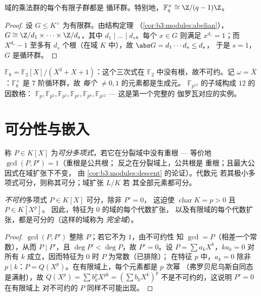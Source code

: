 \begin{theorem}[循环性]\label{thm:b3:galois:cyclic}
域的乘法群的每个有限子群都是
循环群。特别地，$\mathbb F_q^\times \cong
\Z/(q-1)\Z$。
\end{theorem}

\begin{proof}
设 $G \leq K^\times$ 为有限群。由结构定理
（\cref{cor:b3:modules:abelian}），$G \cong \Z/d_1 \times \dots
\times \Z/d_s$，其中 $d_1 \mid \dots \mid d_s$。每个 $x \in G$
则满足 $x^{d_s} = 1$；而 $X^{d_s} - 1$ 至多有
$d_s$ 个根（在域 $K$ 中），故 $\abs G = d_1\cdots d_s \leq d_s$，
于是 $s = 1$，$G$ 是循环群。
\end{proof}

\begin{example}\label{ex:b3:galois:f8}
$\mathbb F_8 = \mathbb F_2[X]/(X^3 + X + 1)$：这个三次式在
$\mathbb F_2$ 中没有根，故不可约。记 $\omega =
\bar X$：$\mathbb F_8^\times$ 是 $7$ 阶循环群，故
\emph{每个} $\neq 0, 1$ 的元素都是生成元。
$\mathbb F_{p^{12}}$ 的子域构成 $12$ 的因数格：
$\mathbb F_p, \mathbb F_{p^2}, \mathbb F_{p^3}, \mathbb F_{p^4},
\mathbb F_{p^6}, \mathbb F_{p^{12}}$ --- 这是第一个完整的
伽罗瓦对应的实例。
\end{example}

\section{可分性与嵌入}

\begin{definition}\label{def:b3:galois:separable}
称 $P \in K[X]$ 为\emph{可分多项式}，若它在分裂域中没有重根 ---
等价地 $\gcd(P, P') = 1$（重根是公共根；
反之在分裂域上，公共根是
重根；且最大公因式在域扩张下不变，
由 \cref{cor:b3:modules:descent} 的论证）。代数元
若其极小多项式可分，则称其可分；域扩张 $L/K$ 若
其全部元素都可分。
\end{definition}

\begin{proposition}\label{prop:b3:galois:perfect}
\emph{不可约}多项式 $P \in K[X]$ 可分，除非 $P' = 0$，
这迫使 $\operatorname{char} K = p > 0$ 且 $P \in K[X^p]$。
因此，特征为 $0$ 的域的每个代数扩张，
以及有限域的每个代数扩张，都是可分的（这样的域称为
\emph{完全域}）。
\end{proposition}

\begin{proof}
$\gcd(P, P')$ 整除 $P$；若它不为 $1$，由不可约性
知 $\gcd = P$（相差一个常数），从而 $P \mid P'$，且 $\deg
P' < \deg P$，故 $P' = 0$。设 $P = \sum a_kX^k$，$ka_k = 0$
对所有 $k$ 成立，因而特征为 $0$ 时 $P$ 为常数（已排除）；
在特征 $p$ 中，$a_k = 0$ 除非 $p \mid k$：$P =
Q(X^p)$。在有限域上，每个元素都是 $p$ 次幂
（弗罗贝尼乌斯自同态是满射），故 $Q(X^p) = \sum b_k^p X^{pk} = (\sum
b_kX^k)^p$ 不是不可约的，这说明 $P' = 0$ 在有限域上
对不可约的 $P$ 同样不可能出现。
\end{proof}

